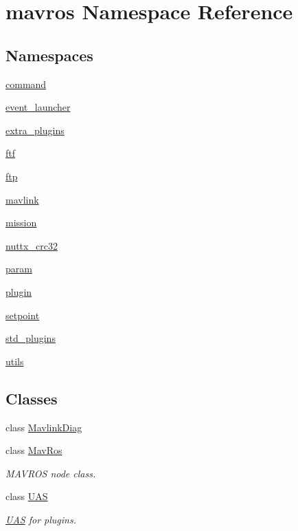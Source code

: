 \hypertarget{namespacemavros}{}\section{mavros Namespace Reference}
\label{namespacemavros}
\subsection*{Namespaces}
\begin{DoxyCompactItemize}
\item 
 \mbox{\hyperlink{namespacemavros_1_1command}{command}}
\item 
 \mbox{\hyperlink{namespacemavros_1_1event__launcher}{event\+\_\+launcher}}
\item 
 \mbox{\hyperlink{namespacemavros_1_1extra__plugins}{extra\+\_\+plugins}}
\item 
 \mbox{\hyperlink{namespacemavros_1_1ftf}{ftf}}
\item 
 \mbox{\hyperlink{namespacemavros_1_1ftp}{ftp}}
\item 
 \mbox{\hyperlink{namespacemavros_1_1mavlink}{mavlink}}
\item 
 \mbox{\hyperlink{namespacemavros_1_1mission}{mission}}
\item 
 \mbox{\hyperlink{namespacemavros_1_1nuttx__crc32}{nuttx\+\_\+crc32}}
\item 
 \mbox{\hyperlink{namespacemavros_1_1param}{param}}
\item 
 \mbox{\hyperlink{namespacemavros_1_1plugin}{plugin}}
\item 
 \mbox{\hyperlink{namespacemavros_1_1setpoint}{setpoint}}
\item 
 \mbox{\hyperlink{namespacemavros_1_1std__plugins}{std\+\_\+plugins}}
\item 
 \mbox{\hyperlink{namespacemavros_1_1utils}{utils}}
\end{DoxyCompactItemize}
\subsection*{Classes}
\begin{DoxyCompactItemize}
\item 
class \mbox{\hyperlink{classmavros_1_1MavlinkDiag}{Mavlink\+Diag}}
\item 
class \mbox{\hyperlink{classmavros_1_1MavRos}{Mav\+Ros}}
\begin{DoxyCompactList}\small\item\em M\+A\+V\+R\+OS node class. \end{DoxyCompactList}\item 
class \mbox{\hyperlink{classmavros_1_1UAS}{U\+AS}}
\begin{DoxyCompactList}\small\item\em \mbox{\hyperlink{classmavros_1_1UAS}{U\+AS}} for plugins. \end{DoxyCompactList}\end{DoxyCompactItemize}

